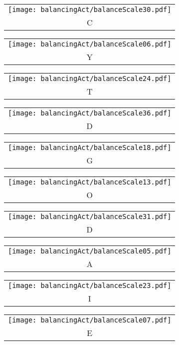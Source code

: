 \begin{puzzle}
\begin{center}
    \begin{tabular}{c}\texttt{[image: balancingAct/balanceScale30.pdf]}\\C\end{tabular}
  \end{center}
  \begin{center}
    \begin{tabular}{c}\texttt{[image: balancingAct/balanceScale06.pdf]}\\Y\end{tabular}
    \begin{tabular}{c}\texttt{[image: balancingAct/balanceScale24.pdf]}\\T\end{tabular}
    \begin{tabular}{c}\texttt{[image: balancingAct/balanceScale36.pdf]}\\D\end{tabular}
    \begin{tabular}{c}\texttt{[image: balancingAct/balanceScale18.pdf]}\\G\end{tabular}
  \end{center}
  \begin{center}
    \begin{tabular}{c}\texttt{[image: balancingAct/balanceScale13.pdf]}\\O\end{tabular}
    \begin{tabular}{c}\texttt{[image: balancingAct/balanceScale31.pdf]}\\D\end{tabular}
    \begin{tabular}{c}\texttt{[image: balancingAct/balanceScale05.pdf]}\\A\end{tabular}
    \begin{tabular}{c}\texttt{[image: balancingAct/balanceScale23.pdf]}\\I\end{tabular}
  \end{center}
  \begin{center}
    \begin{tabular}{c}\texttt{[image: balancingAct/balanceScale07.pdf]}\\E\end{tabular}

\end{center}
\end{puzzle}
